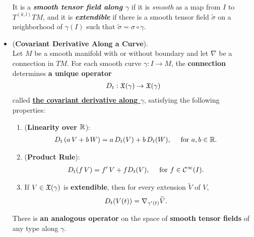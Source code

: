 \documentclass[11pt]{article}
\begin{document}
\begin{itemize}
\begin{definition}
It is a \emph{\textbf{smooth tensor field along $\gamma$}} if it is \emph{smooth} as a map from $I$ to $T^{(k,l)}TM$, and it is \emph{\textbf{extendible}} if there is a smooth tensor field $\widetilde{\sigma}$ on a neighborhood of $\gamma(I)$ such that $\widetilde{\sigma} = \sigma \circ \gamma$.
\end{definition}

\item \begin{theorem} (\textbf{Covariant Derivative Along a Curve}). \\
Let $M$ be a smooth manifold with or without boundary and let $\nabla$ be a connection in $TM$. For each smooth curve $\gamma: I \rightarrow M$, the \textbf{connection} determines \textbf{a unique operator} 
\begin{align*}
D_t: {\mathfrak X}(\gamma) \rightarrow {\mathfrak X}(\gamma)
\end{align*} called \underline{\textbf{the covariant derivative along $\gamma$}}, satisfying the following properties:
\begin{enumerate}
\item (\textbf{Linearity over ${\mathbb R}$}):
\begin{align*}
D_t\left(a\,V + b\,W\right) &= a\,D_t(V) + b\,D_t(W), \quad \text{ for }a,b \in {\mathbb R}.
\end{align*}
\item (\textbf{Product Rule}):
\begin{align*}
D_t(f\,V) &= f'\,V + f D_t(V), \quad \text{ for }f \in {\mathcal C}^{\infty}(I).
\end{align*}
\item If $V \in {\mathfrak X}(\gamma)$ is \textbf{extendible}, then for every extension $\widetilde{V}$ of $V$,
\begin{align*}
D_t(V(t)) &= \nabla_{\gamma'(t)}{\widetilde{V}}.
\end{align*}
\end{enumerate} There is \textbf{an analogous operator} on the space of \textbf{smooth tensor fields} of any type along $\gamma$.
\end{theorem}



\end{itemize}
\end{document}

